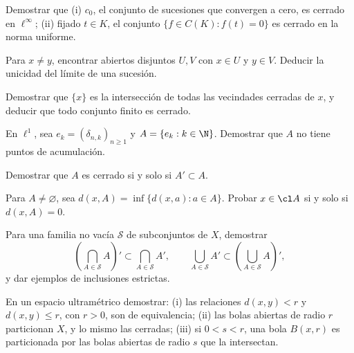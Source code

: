 \begin{ejercicio}\label{ej:lectura-3-2}
Demostrar que (i) $c_0$, el conjunto de sucesiones que convergen a cero, es cerrado en $\ell^\infty$; (ii) fijado $t\in K$, el conjunto $\{f\in C(K):f(t)=0\}$ es cerrado en la norma uniforme.
\end{ejercicio}


\begin{ejercicio}\label{ej:lectura-3-3}
Para $x\ne y$, encontrar abiertos disjuntos $U,V$ con $x\in U$ y $y\in V$. Deducir la unicidad del límite de una sucesión.
\end{ejercicio}


\begin{ejercicio}\label{ej:lectura-3-4}
Demostrar que $\{x\}$ es la intersección de todas las vecindades cerradas de $x$, y deducir que todo conjunto finito es cerrado.
\end{ejercicio}


\begin{ejercicio}\label{ej:lectura-3-5}
En $\ell^1$, sea $e_k=(\delta_{n,k})_{n\ge1}$ y $A=\{e_k:k\in\N\}$. Demostrar que $A$ no tiene puntos de acumulación.
\end{ejercicio}


\begin{ejercicio}\label{ej:lectura-3-6}
Demostrar que $A$ es cerrado si y solo si $A'\subset A$.
\end{ejercicio}


\begin{ejercicio}\label{ej:lectura-3-7}
Para $A\ne\varnothing$, sea $d(x,A)=\inf\{d(x,a):a\in A\}$. Probar $x\in\cl A$ si y solo si $d(x,A)=0$.
\end{ejercicio}


\begin{ejercicio}\label{ej:lectura-3-8}
Para una familia no vacía $\mathcal S$ de subconjuntos de $X$, demostrar
\[
\left(\bigcap_{A\in\mathcal S}A\right)'\subset\bigcap_{A\in\mathcal S}A',\qquad
\bigcup_{A\in\mathcal S}A'\subset\left(\bigcup_{A\in\mathcal S}A\right)',
\]
y dar ejemplos de inclusiones estrictas.
\end{ejercicio}


\begin{ejercicio}\label{ej:lectura-3-9}
En un espacio ultramétrico demostrar: (i) las relaciones $d(x,y)<r$ y $d(x,y)\le r$, con $r>0$, son de equivalencia; (ii) las bolas abiertas de radio $r$ particionan $X$, y lo mismo las cerradas; (iii) si $0<s<r$, una bola $B(x,r)$ es particionada por las bolas abiertas de radio $s$ que la intersectan.
\end{ejercicio}



